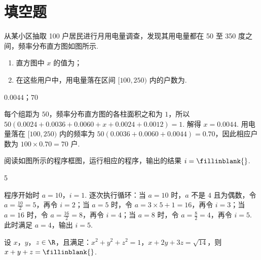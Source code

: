 \section{填空题}

\begin{problem}
从某小区抽取 100 户居民进行月用电量调查，发现其用电量都在 50 至 350 度之间，频率分布直方图如图所示.

\begin{enumerate}
\item 直方图中 \(x\) 的值为\fillinblank{}；
\item 在这些用户中，用电量落在区间 \([100,250)\) 内的户数为\fillinblank{}.
\end{enumerate}

\end{problem}

\begin{answer}
\(0.0044\)；\(70\)
\end{answer}

\begin{solution}
每个组距为 \(50\)，频率分布直方图的各柱面积之和为 \(1\)，所以
\(50\left(0.0024+0.0036+0.0060+x+0.0024+0.0012\right)=1\).
解得 \(x=0.0044\).
用电量落在 \([100,250)\) 内的频率为
\(50(0.0036+0.0060+0.0044)=0.70\)，因此相应户数为 \(100\times0.70=70\) 户.
\end{solution}

\begin{problem}
阅读如图所示的程序框图，运行相应的程序，输出的结果 \(i=\fillinblank{}\).

\end{problem}

\begin{answer}
5
\end{answer}

\begin{solution}
程序开始时 \(a=10\)，\(i=1\). 逐次执行循环：当 \(a=10\) 时，\(a\) 不是 \(4\) 且为偶数，令 \(a=\frac{10}{2}=5\)，再令 \(i=2\)；当 \(a=5\) 时，令 \(a=3\times5+1=16\)，再令 \(i=3\)；当 \(a=16\) 时，令 \(a=\frac{16}{2}=8\)，再令 \(i=4\)；当 \(a=8\) 时，令 \(a=\frac{8}{2}=4\)，再令 \(i=5\). 此时满足 \(a=4\)，输出 \(i=5\).
\end{solution}

\begin{problem}
设 \(x\)，\(y\)，\(z \in \R\)，且满足：\(x^2 + y^2 + z^2 = 1\)，\(x + 2y + 3z = \sqrt{14}\)，则 \(x + y + z =\fillinblank{}\).
\end{problem}

